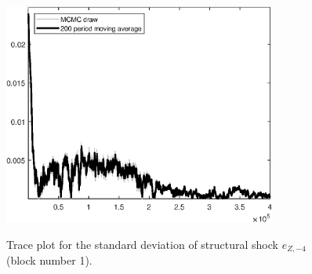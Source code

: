 \begin{figure}[H]
\centering
  \includegraphics[width=0.8\textwidth]{BRS_sectoral/graphs/TracePlot_SE_e_Z_news_4_blck_1}\\
    \caption{Trace plot for the standard deviation of structural shock ${e_{Z,-4}}$ (block number 1).}
\end{figure}

